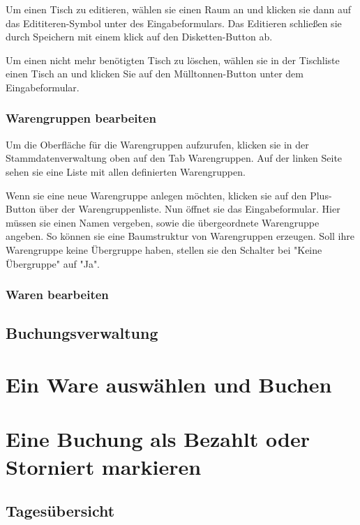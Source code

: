 Um einen Tisch zu editieren, wählen sie einen Raum an und klicken sie dann auf das Edititeren-Symbol unter des Eingabeformulars. Das Editieren schließen sie durch Speichern mit einem klick auf den Disketten-Button ab.

Um einen nicht mehr benötigten Tisch zu löschen, wählen sie in der Tischliste einen Tisch an und klicken Sie auf den Mülltonnen-Button unter dem Eingabeformular.

\subsubsection{Warengruppen bearbeiten}

Um die Oberfläche für die Warengruppen aufzurufen, klicken sie in der Stammdatenverwaltung oben auf den Tab Warengruppen. Auf der linken Seite sehen sie eine Liste mit allen definierten Warengruppen. 

Wenn sie eine neue Warengruppe anlegen möchten, klicken sie auf den Plus-Button über der Warengruppenliste. Nun öffnet sie das Eingabeformular. Hier müssen sie einen Namen vergeben, sowie die übergeordnete Warengruppe angeben. So können sie eine Baumstruktur von Warengruppen erzeugen. Soll ihre Warengruppe keine Übergruppe haben, stellen sie den Schalter bei "Keine Übergruppe" auf "Ja".



\subsubsection{Waren bearbeiten}

\subsection{Buchungsverwaltung}

\section{Ein Ware auswählen und Buchen}

\section{Eine Buchung als Bezahlt oder Storniert markieren}

\subsection{Tagesübersicht}